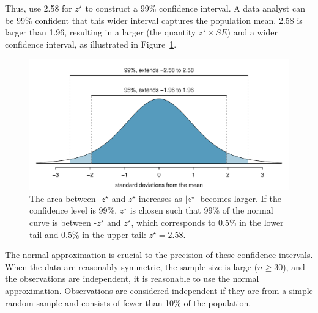 \begin{spacing}{1.5}
Thus, use 2.58 for $z^{\star}$ to construct a 99\% confidence interval. A data analyst can be 99\% confident that this wider interval captures the population mean. 2.58 is larger than 1.96, resulting in a larger  (the quantity $z^{\star} \times SE$) and a wider confidence interval, as illustrated in Figure~\ref{choosingZForCI}.

\begin{figure}[h]
	\centering
	\includegraphics[width=\textwidth]
	{ch_inference_foundations_oi_biostat/figures/choosingZForCI/choosingZForCI}
	\caption{The area between -$z^{\star}$ and $z^{\star}$ increases as $|z^{\star}|$ becomes larger. If the confidence level is 99\%, $z^{\star}$ is chosen such that 99\% of the normal curve is between -$z^{\star}$ and $z^{\star}$, which corresponds to 0.5\% in the lower tail and 0.5\% in the upper tail: $z^{\star}=2.58$.}
	\label{choosingZForCI}
\end{figure}
 
The normal approximation is crucial to the precision of these confidence intervals. When the data are reasonably symmetric, the sample size is large ($n \geq 30$), and the observations are independent, it is reasonable to use the normal approximation. Observations are considered independent if they are from a simple random sample and consists of fewer than 10\% of the population. 



\end{spacing}
